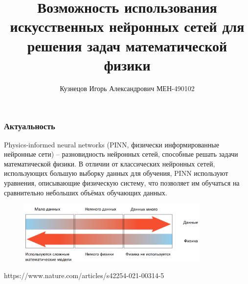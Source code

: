\documentclass[t]{beamer}
\begin{document}
    \title{Возможность использования искусственных нейронных сетей для решения задач математической физики}
    \author{Кузнецов Игорь Александрович МЕН-490102}
    \date{}
    \begin{frame}
        \titlepage
    \end{frame}

    \begin{frame}
        \frametitle{Актуальность}
        Physics-informed neural networks (PINN, физически информированные нейронные сети) -- разновидность нейронных сетей, способные решать задачи математической физики. В отличии от классических нейронных сетей, использующих большую выборку данных для обучения, PINN используют уравнения, описывающие физическую систему, что позволяет им обучаться на сравнительно небольших объёмах обучающих данных.
        \begin{figure}
            \center
            \includegraphics[width=0.85\textwidth]{Данные-Физика.png}
        \end{figure}
        https://www.nature.com/articles/s42254-021-00314-5
    \end{frame}
\end{document}
